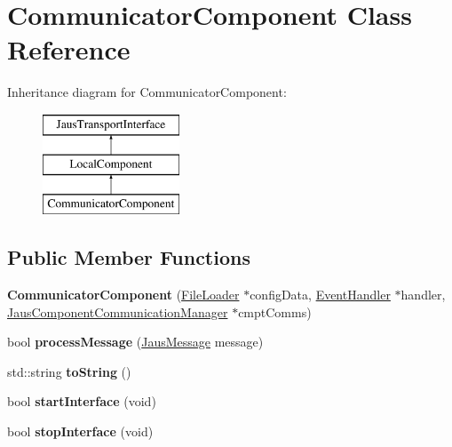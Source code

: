 \hypertarget{class_communicator_component}{\section{\-Communicator\-Component \-Class \-Reference}
\label{class_communicator_component}
}
\-Inheritance diagram for \-Communicator\-Component\-:\begin{figure}[H]
\begin{center}
\leavevmode
\includegraphics[height=3.000000cm]{class_communicator_component}
\end{center}
\end{figure}
\subsection*{\-Public \-Member \-Functions}
\begin{DoxyCompactItemize}
\item 
\hypertarget{class_communicator_component_a5a23c8a3c1270e654d70a2f5fa44fdbe}{{\bfseries \-Communicator\-Component} (\hyperlink{class_file_loader}{\-File\-Loader} $\ast$config\-Data, \hyperlink{class_event_handler}{\-Event\-Handler} $\ast$handler, \hyperlink{class_jaus_component_communication_manager}{\-Jaus\-Component\-Communication\-Manager} $\ast$cmpt\-Comms)}\label{class_communicator_component_a5a23c8a3c1270e654d70a2f5fa44fdbe}

\item 
\hypertarget{class_communicator_component_a19f8f3c0d1ae115edcc7bf2598d98a7e}{bool {\bfseries process\-Message} (\hyperlink{struct_jaus_message_struct}{\-Jaus\-Message} message)}\label{class_communicator_component_a19f8f3c0d1ae115edcc7bf2598d98a7e}

\item 
\hypertarget{class_communicator_component_a53954c3b57b76a69c08d1a28c8eafbb7}{std\-::string {\bfseries to\-String} ()}\label{class_communicator_component_a53954c3b57b76a69c08d1a28c8eafbb7}

\item 
\hypertarget{class_communicator_component_a872a573c1af878164c102720bda71727}{bool {\bfseries start\-Interface} (void)}\label{class_communicator_component_a872a573c1af878164c102720bda71727}

\item 
\hypertarget{class_communicator_component_a71974e83c38dd193b675305795694a04}{bool {\bfseries stop\-Interface} (void)}\label{class_communicator_component_a71974e83c38dd193b675305795694a04}

\end{DoxyCompactItemize}
